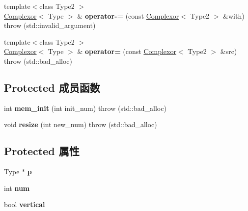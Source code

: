 \begin{DoxyCompactItemize}
\item 
\mbox{\label{classkerbal_1_1math_1_1_complexor_a28f38588243c750c44fa83555487574f}} 
{\footnotesize template$<$class Type2 $>$ }\\\hyperlink{classkerbal_1_1math_1_1_complexor}{Complexor}$<$ Type $>$ \& {\bfseries operator-\/=} (const \hyperlink{classkerbal_1_1math_1_1_complexor}{Complexor}$<$ Type2 $>$ \&with)  throw (std\+::invalid\+\_\+argument)
\item 
\mbox{\label{classkerbal_1_1math_1_1_complexor_a63a00225647efcb656ce2da5c7a94ddd}} 
{\footnotesize template$<$class Type2 $>$ }\\\hyperlink{classkerbal_1_1math_1_1_complexor}{Complexor}$<$ Type $>$ \& {\bfseries operator=} (const \hyperlink{classkerbal_1_1math_1_1_complexor}{Complexor}$<$ Type2 $>$ \&src)  throw (std\+::bad\+\_\+alloc)
\end{DoxyCompactItemize}
\subsection*{Protected 成员函数}
\begin{DoxyCompactItemize}
\item 
\mbox{\label{classkerbal_1_1math_1_1_complexor_a9fb67ef05bfb0b390aeaf1a96868f658}} 
int {\bfseries mem\+\_\+init} (int init\+\_\+num)  throw (std\+::bad\+\_\+alloc)
\item 
\mbox{\label{classkerbal_1_1math_1_1_complexor_a8046bc18aaee893434013f8100700dba}} 
void {\bfseries resize} (int new\+\_\+num)  throw (std\+::bad\+\_\+alloc)
\end{DoxyCompactItemize}
\subsection*{Protected 属性}
\begin{DoxyCompactItemize}
\item 
\mbox{\label{classkerbal_1_1math_1_1_complexor_aa41dd3173639bde5577b1e810c70dc51}} 
Type $\ast$ {\bfseries p}
\item 
\mbox{\label{classkerbal_1_1math_1_1_complexor_aaa4d405d9dc8abaa2fe7774fc10a6332}} 
int {\bfseries num}
\item 
\mbox{\label{classkerbal_1_1math_1_1_complexor_acb2acc93ee33d016d463a469087716f8}} 
bool {\bfseries vertical}
\end{DoxyCompactItemize}
